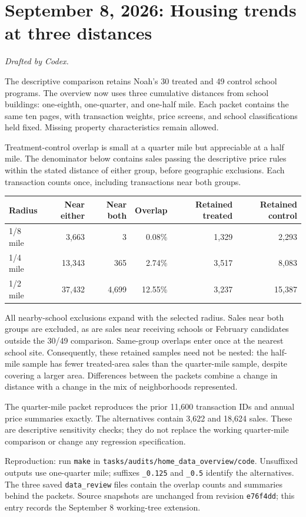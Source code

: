 \section*{September 8, 2026: Housing trends at three distances}
\textit{Drafted by Codex.}

The descriptive comparison retains Noah's 30 treated and 49 control school
programs. The overview now uses three cumulative distances from school
buildings: one-eighth, one-quarter, and one-half mile. Each packet contains
the same ten pages, with transaction weights, price screens, and school
classifications held fixed. Missing property characteristics remain allowed.

Treatment-control overlap is small at a quarter mile but appreciable at a
half mile. The denominator below contains sales passing the descriptive price
rules within the stated distance of either group, before geographic exclusions.
Each transaction counts once, including transactions near both groups.

\begin{center}
\begin{tabular}{lrrrrr}
Radius & Near either & Near both & Overlap & Retained treated & Retained control\\
\hline
1/8 mile & 3,663 & 3 & 0.08\% & 1,329 & 2,293\\
1/4 mile & 13,343 & 365 & 2.74\% & 3,517 & 8,083\\
1/2 mile & 37,432 & 4,699 & 12.55\% & 3,237 & 15,387\\
\end{tabular}
\end{center}

All nearby-school exclusions expand with the selected radius. Sales near both
groups are excluded, as are sales near receiving schools or February
candidates outside the 30/49 comparison. Same-group overlaps enter once at the
nearest school site. Consequently, these retained samples need not be nested:
the half-mile sample has fewer treated-area sales than the quarter-mile sample,
despite covering a larger area. Differences between the packets combine a
change in distance with a change in the mix of neighborhoods represented.

The quarter-mile packet reproduces the prior 11,600 transaction IDs and
annual price summaries exactly. The alternatives contain 3,622 and 18,624
sales. These are descriptive sensitivity checks; they do not replace the
working quarter-mile comparison or change any regression specification.

\small
Reproduction: run \texttt{make} in
\texttt{tasks/audits/home\_data\_overview/code}.
Unsuffixed outputs use one-quarter mile; suffixes \texttt{\_0.125} and
\texttt{\_0.5} identify the alternatives. The three saved
\texttt{data\_review} files contain the overlap counts and summaries behind
the packets. Source snapshots are unchanged from revision \texttt{e76f4dd};
this entry records the September 8 working-tree extension.
\normalsize
